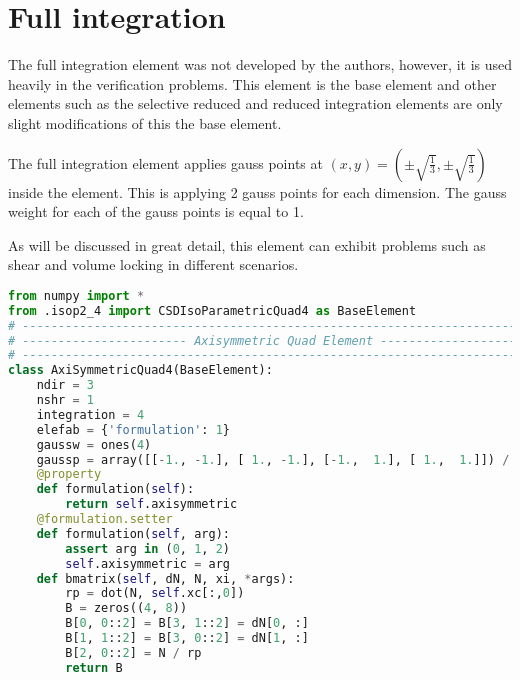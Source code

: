 \documentclass[10pt,letterpaper]{report}
\numberwithin{equation}{chapter}
\begin{document}
\section{Full integration}
The full integration element was not developed by the authors, however, it is used heavily in the verification problems. This element is the base element and other elements such as the selective reduced and reduced integration elements are only slight modifications of this the base element.

The full integration element applies gauss points at $(x,y)=(\pm\sqrt{\frac{1}{3}},\pm\sqrt{\frac{1}{3}})$ inside the element. This is applying 2 gauss points for each dimension. The gauss weight for each of the gauss points is equal to 1.

As will be discussed in great detail, this element can exhibit problems such as shear and volume locking in different scenarios.
\newpage
\begin{lstlisting}[language=python]
from numpy import *
from .isop2_4 import CSDIsoParametricQuad4 as BaseElement
# --------------------------------------------------------------------------- #
# ----------------------- Axisymmetric Quad Element ------------------------- #
# --------------------------------------------------------------------------- #
class AxiSymmetricQuad4(BaseElement):
    ndir = 3
    nshr = 1
    integration = 4
    elefab = {'formulation': 1}
    gaussw = ones(4)
    gaussp = array([[-1., -1.], [ 1., -1.], [-1.,  1.], [ 1.,  1.]]) / sqrt(3.)
    @property
    def formulation(self):
        return self.axisymmetric
    @formulation.setter
    def formulation(self, arg):
        assert arg in (0, 1, 2)
        self.axisymmetric = arg
    def bmatrix(self, dN, N, xi, *args):
        rp = dot(N, self.xc[:,0])
        B = zeros((4, 8))
        B[0, 0::2] = B[3, 1::2] = dN[0, :]
        B[1, 1::2] = B[3, 0::2] = dN[1, :]
        B[2, 0::2] = N / rp
        return B

\end{lstlisting}
\end{document}
